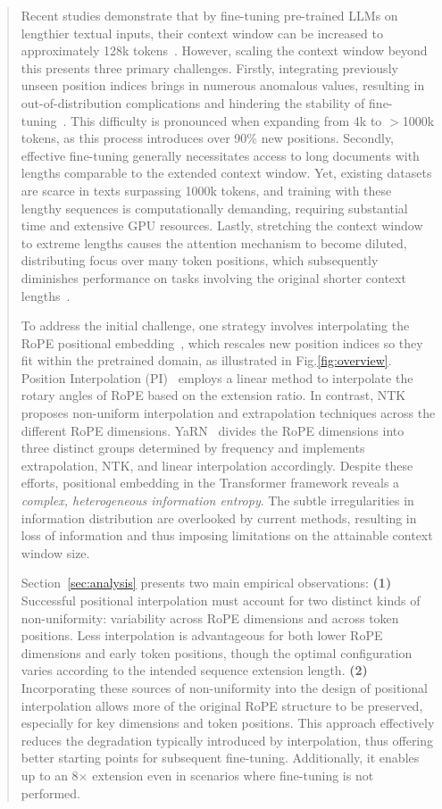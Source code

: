 \begin{abstract}
Recent studies demonstrate that by fine-tuning pre-trained LLMs on lengthier textual inputs, their context window can be increased to approximately 128k tokens~\cite{longlora,pi,yarn,zhang2024soaring,liu2023scaling}. However, scaling the context window beyond this presents three primary challenges. Firstly, integrating previously unseen position indices brings in numerous anomalous values, resulting in out-of-distribution complications and hindering the stability of fine-tuning~\cite{pi}. This difficulty is pronounced when expanding from 4k to $>$1000k tokens, as this process introduces over 90\% new positions. Secondly, effective fine-tuning generally necessitates access to long documents with lengths comparable to the extended context window. Yet, existing datasets are scarce in texts surpassing 1000k tokens, and training with these lengthy sequences is computationally demanding, requiring substantial time and extensive GPU resources. Lastly, stretching the context window to extreme lengths causes the attention mechanism to become diluted, distributing focus over many token positions, which subsequently diminishes performance on tasks involving the original shorter context lengths~\cite{pi}.

To address the initial challenge, one strategy involves interpolating the RoPE positional embedding~\cite{rope,pi}, which rescales new position indices so they fit within the pretrained domain, as illustrated in Fig.\ref{fig:overview}. Position Interpolation (PI)~\cite{pi} employs a linear method to interpolate the rotary angles of RoPE based on the extension ratio. In contrast, NTK~\cite{ntk,dynamicntk} proposes non-uniform interpolation and extrapolation techniques across the different RoPE dimensions. YaRN~\cite{yarn} divides the RoPE dimensions into three distinct groups determined by frequency and implements extrapolation, NTK, and linear interpolation accordingly. Despite these efforts, positional embedding in the Transformer framework reveals a \emph{complex, heterogeneous information entropy}. The subtle irregularities in information distribution are overlooked by current methods, resulting in loss of information and thus imposing limitations on the attainable context window size.

Section~\ref{sec:analysis} presents two main empirical observations: \textbf{(1)} Successful positional interpolation must account for two distinct kinds of non-uniformity: variability across RoPE dimensions and across token positions. Less interpolation is advantageous for both lower RoPE dimensions and early token positions, though the optimal configuration varies according to the intended sequence extension length.
  \textbf{(2)} Incorporating these sources of non-uniformity into the design of positional interpolation allows more of the original RoPE structure to be preserved, especially for key dimensions and token positions. This approach effectively reduces the degradation typically introduced by interpolation, thus offering better starting points for subsequent fine-tuning. Additionally, it enables up to an 8$\times$ extension even in scenarios where fine-tuning is not performed.


\end{abstract}
